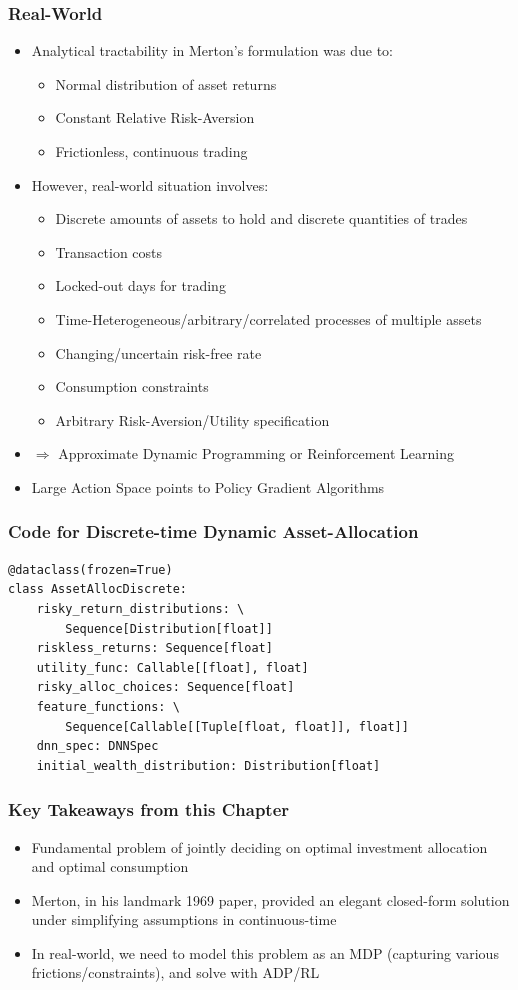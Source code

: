 \documentclass[handout]{beamer}
\begin{document}
\begin{frame}
\frametitle{Real-World}
\pause
\begin{itemize}[<+->]
\item Analytical tractability in Merton's formulation was due to:
\begin{itemize}
\item Normal distribution of asset returns
\item Constant Relative Risk-Aversion
\item Frictionless, continuous trading
\end{itemize}
\item However, real-world situation involves:
\begin{itemize}
\item Discrete amounts of assets to hold and discrete quantities of trades
\item Transaction costs
\item Locked-out days for trading
\item Time-Heterogeneous/arbitrary/correlated processes of multiple assets
\item Changing/uncertain risk-free rate
\item Consumption constraints
\item Arbitrary Risk-Aversion/Utility specification
\end{itemize}
\item $\Rightarrow$ Approximate Dynamic Programming or Reinforcement Learning
\item Large Action Space points to Policy Gradient Algorithms
\end{itemize}
\end{frame}


\begin{frame}[fragile]
\frametitle{Code for Discrete-time Dynamic Asset-Allocation}
\pause
\begin{lstlisting}
@dataclass(frozen=True)
class AssetAllocDiscrete:
    risky_return_distributions: \
        Sequence[Distribution[float]]
    riskless_returns: Sequence[float]
    utility_func: Callable[[float], float]
    risky_alloc_choices: Sequence[float]
    feature_functions: \
        Sequence[Callable[[Tuple[float, float]], float]]
    dnn_spec: DNNSpec
    initial_wealth_distribution: Distribution[float]
\end{lstlisting}    
\end{frame}

\begin{frame}
\frametitle{Key Takeaways from this Chapter}
\pause
\begin{itemize}[<+->]
\item Fundamental problem of jointly deciding on optimal investment allocation and optimal consumption
\item Merton, in his landmark 1969 paper, provided an elegant closed-form solution under simplifying assumptions in continuous-time
\item In real-world, we need to model this problem as an MDP (capturing various frictions/constraints), and solve with ADP/RL
\end{itemize}
\end{frame}    
\end{document}
